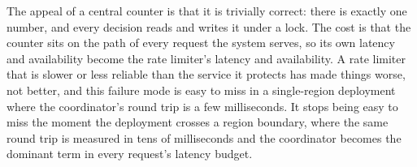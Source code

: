 The appeal of a central counter is that it is trivially correct: there is exactly one
number, and every decision reads and writes it under a lock. The cost is that the counter
sits on the path of every request the system serves, so its own latency and availability
become the rate limiter's latency and availability. A rate limiter that is slower or less
reliable than the service it protects has made things worse, not better, and this failure
mode is easy to miss in a single-region deployment where the coordinator's round trip is a
few milliseconds. It stops being easy to miss the moment the deployment crosses a region
boundary, where the same round trip is measured in tens of milliseconds and the coordinator
becomes the dominant term in every request's latency budget.
